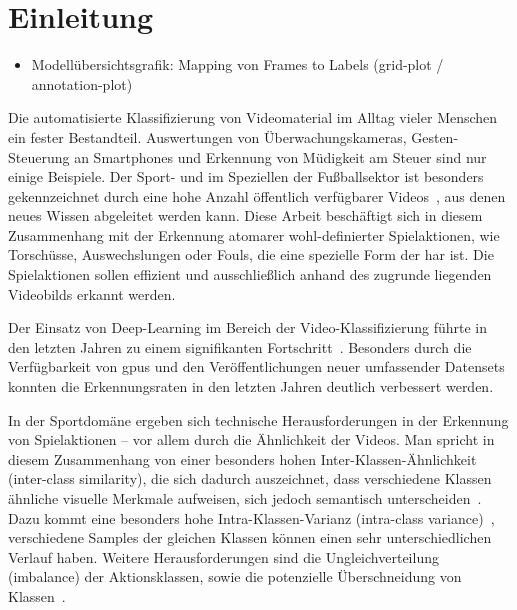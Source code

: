 \chapter{Einleitung}
\label{ch:intro}

\begin{tcolorbox}[title=Todo]
 \begin{itemize}
  \item Modellübersichtsgrafik: Mapping von Frames to Labels (grid-plot / annotation-plot)
 \end{itemize}
 \end{tcolorbox}

Die automatisierte Klassifizierung von Videomaterial im Alltag vieler Menschen ein fester Bestandteil.
Auswertungen von Überwachungskameras, Gesten-Steuerung an Smartphones und Erkennung von Müdigkeit am Steuer sind nur einige Beispiele.
Der Sport- und im Speziellen der Fußballsektor ist besonders gekennzeichnet durch eine hohe Anzahl öffentlich verfügbarer Videos~\cite{Giancola18}, aus denen neues Wissen abgeleitet werden kann.
Diese Arbeit beschäftigt sich in diesem Zusammenhang mit der Erkennung atomarer wohl-definierter Spielaktionen, wie Torschüsse, Auswechslungen oder Fouls, die eine spezielle Form der \gls{har} ist.
Die Spielaktionen sollen effizient und ausschließlich anhand des zugrunde liegenden Videobilds erkannt werden.

Der Einsatz von Deep-Learning im Bereich der Video-Klassifizierung führte in den letzten Jahren zu einem signifikanten Fortschritt~\cite{Abu-Bakar19}.
Besonders durch die Verfügbarkeit von \glspl{gpu} und den Veröffentlichungen neuer umfassender Datensets konnten die Erkennungsraten in den letzten Jahren deutlich verbessert werden. %

In der Sportdomäne ergeben sich technische Herausforderungen in der Erkennung von Spielaktionen -- vor allem durch die Ähnlichkeit der Videos.
Man spricht in diesem Zusammenhang von einer besonders hohen Inter-Klassen-Ähnlichkeit (inter-class similarity), die sich dadurch auszeichnet, dass verschiedene Klassen ähnliche visuelle Merkmale aufweisen, sich jedoch semantisch unterscheiden~\cite{Sozykin17}.
Dazu kommt eine besonders hohe Intra-Klassen-Varianz (intra-class variance)~\cite{Ballan09}, \dh verschiedene Samples der gleichen Klassen können einen sehr unterschiedlichen Verlauf haben.
Weitere Herausforderungen sind die Ungleichverteilung (imbalance) der Aktionsklassen, sowie die potenzielle Überschneidung von Klassen~\cite{Jiang19}.

